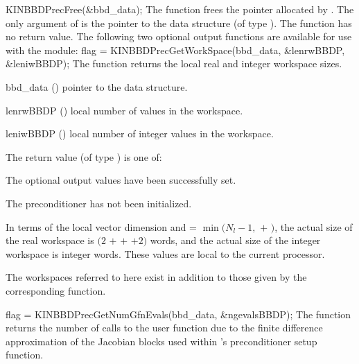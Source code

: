 {}
{
  KINBBDPrecFree(\&bbd\_data);
}
{
  The function  frees the pointer allocated by
  .
}
{
  The only argument of  is the pointer to the {\kinbbdpre} 
  data structure (of type ).
}
{
  The function  has no return value.
}
{}
The following two optional output functions are available for use with
the {\kinbbdpre} module:
{
  flag = KINBBDPrecGetWorkSpace(bbd\_data, \&lenrwBBDP, \&leniwBBDP);
}
{
  The function  returns the local
  {\kinbbdpre} real and integer workspace sizes.
}
{
  \begin{args}[lenrwBBDP]
  \item[bbd\_data] ()
    pointer to the {\kinbbdpre} data structure.
  \item[lenrwBBDP] ()
    local number of  values in the {\kinbbdpre} workspace.
  \item[leniwBBDP] ()
    local number of integer values in the {\kinbbdpre} workspace.
  \end{args}
}
{
  The return value  (of type ) is one of:
  \begin{args}
  \item[\Id{KINBBDPRE\_SUCCESS}] 
    The optional output values have been successfully set.
  \item[\Id{KINBBDPRE\_PDATA\_NULL}]
    The {\kinbbdpre} preconditioner has not been initialized.
  \end{args}
}
{
  In terms of the local vector dimension  and
   = $\min ( N_l - 1 ,$  $+$ $)$, the actual size
  of the real workspace is $(2$  $+$  $+$  $+2)$ 
   words, and the actual size of the integer workspace is
   integer words. These values are local to the current processor.

  The workspaces referred to here exist in addition to those given by the
  corresponding  function.
}
{
  flag = KINBBDPrecGetNumGfnEvals(bbd\_data, \&ngevalsBBDP);
}
{
  The function  returns the
  number of calls to the user  function due to the 
  finite difference approximation of the Jacobian blocks used within
  {\kinbbdpre}'s preconditioner setup function.
}
